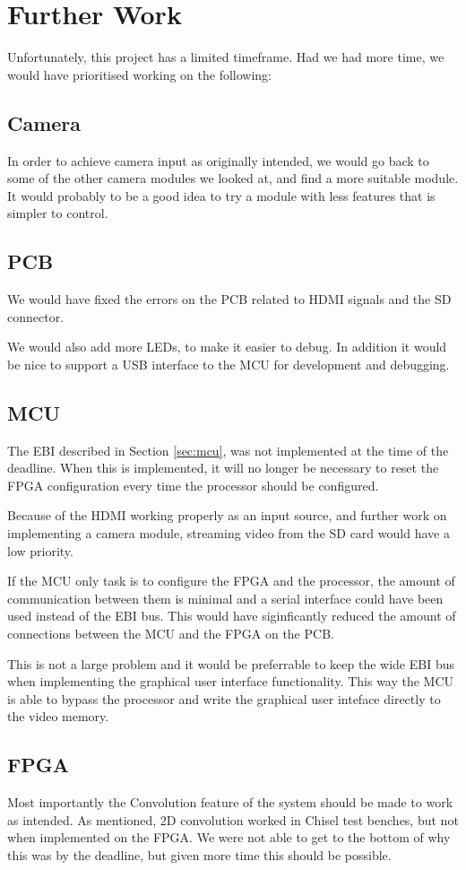 \section{Further Work}

Unfortunately, this project has a limited timeframe.
Had we had more time, we would have prioritised working on the following:

\subsection{Camera}
In order to achieve camera input as originally intended, we would go back to some of the other camera modules we looked at, and find a more suitable module.
It would probably to be a good idea to try a module with less features that is simpler to control.

\subsection{PCB}
We would have fixed the errors on the PCB related to HDMI signals and the SD connector.

We would also add more LEDs, to make it easier to debug.
In addition it would be nice to support a USB interface to the MCU for development and debugging.

\subsection{MCU}
The EBI described in Section \ref{sec:mcu}, was not implemented at the time of the deadline.
When this is implemented, it will no longer be necessary to reset the FPGA configuration every time the processor should be configured.

Because of the HDMI working properly as an input source, and further work on implementing a camera module, streaming video from the SD card would have a low priority.

If the MCU only task is to configure the FPGA and the processor, the amount of communication between them is minimal and a serial interface could have been used instead of the EBI bus.
This would have siginficantly reduced the amount of connections between the MCU and the FPGA on the PCB.

This is not a large problem and it would be preferrable to keep the wide EBI bus when implementing the graphical user interface functionality.
This way the MCU is able to bypass the processor and write the graphical user inteface directly to the video memory.

\subsection{FPGA}
Most importantly the Convolution feature of the system should be made to work as intended.
As mentioned, 2D convolution worked in Chisel test benches, but not when implemented on the FPGA.
We were not able to get to the bottom of why this was by the deadline, but given more time this should be possible.

